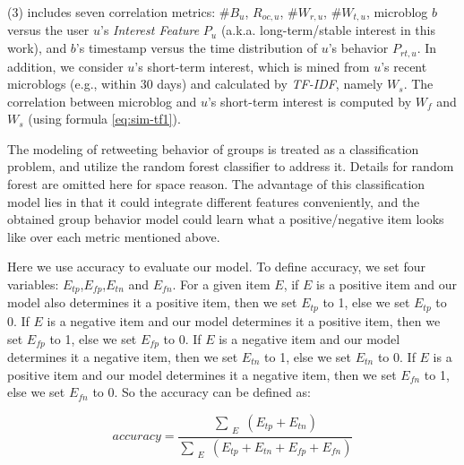 	\stab(3)  includes seven correlation metrics: \#$B_u$, $R_{oc,u}$, \#$W_{r,u}$, \#$W_{t,u}$, microblog $b$ versus the user $u$'s \textit{Interest Feature} $P_u$ (a.k.a. long-term/stable interest in this work), and $b$'s timestamp versus the time distribution of $u$'s \retg{} behavior $P_{rt,u}$.
In addition, we consider $u$'s short-term interest, which is mined from $u$'s recent microblogs (e.g., within 30 days) and calculated by \textit{TF-IDF}, namely $W_s$.
The correlation between microblog and $u$'s short-term interest is computed by $W_f$ and $W_s$ (using formula \ref{eq:sim-tf1}).

The modeling of retweeting behavior of groups is treated as a classification problem, and utilize the random forest classifier to address it. Details for random forest \cite{IEEEexample:conf/icdar/Ho1995} are omitted here for space reason.
The advantage of this classification model lies in that it could integrate different features conveniently, and
the obtained group behavior model could learn what a positive/negative item looks like over each metric mentioned above. \par
Here we use accuracy to evaluate our model. To define accuracy, we set four variables: $E_{tp}$,$E_{fp}$,$E_{tn}$ and $E_{fn}$. For a given item $E$, if $E$ is a positive item and our model also determines it a positive item, then we set $E_{tp}$ to 1, else we set $E_{tp}$ to 0. If $E$ is a negative item and our model determines it a positive item, then we set $E_{fp}$ to 1, else we set $E_{fp}$ to 0. If $E$ is a negative item and our model determines it a negative item, then we set $E_{tn}$ to 1, else we set $E_{tn}$ to 0. If $E$ is a positive item and our model determines it a negative item, then we set $E_{fn}$ to 1, else we set $E_{fn}$ to 0. So the accuracy can be defined as:

\begin{equation}
\label{eq:def-precision1}
accuracy = \frac{\sum_{\substack{E}} (E_{tp} + E_{tn} )}{ \sum_{\substack{E}} (E_{tp} + E_{tn} + E_{fp} + E_{fn}) }
\end{equation}


















